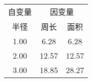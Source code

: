 \begin{tabular}{|c||cc|}
\hline\hline
自变量 & \multicolumn{2}{c|}{因变量} \\
\cline{2-3}
半径 & 周长 & 面积 \\
\hline\hline
1.00 & 6.28 & 6.28 \\
2.00 & 12.57 & 12.57 \\
3.00 & 18.85 & 28.27 \\
\hline\hline
\end{tabular}
